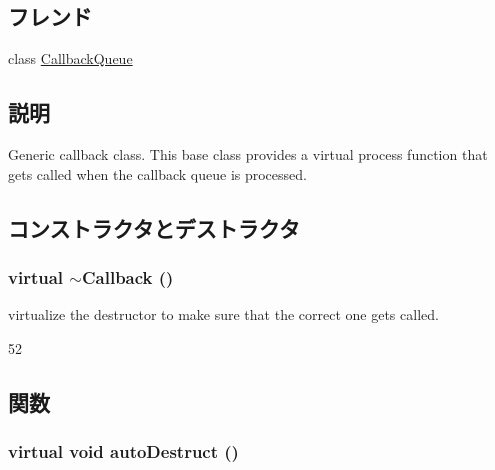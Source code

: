 \subsection*{フレンド}
\begin{DoxyCompactItemize}
\item 
class \hyperlink{classCallback_a49078cbddf43eb933f0b6de2fd77c97d}{CallbackQueue}
\end{DoxyCompactItemize}


\subsection{説明}
Generic callback class. This base class provides a virtual process function that gets called when the callback queue is processed. 

\subsection{コンストラクタとデストラクタ}
\hypertarget{classCallback_afdd27f2a21e4fdc3687ee72aae117e7d}{
\subsubsection[{$\sim$Callback}]{\setlength{\rightskip}{0pt plus 5cm}virtual $\sim${\bf Callback} ()}}
\label{classCallback_afdd27f2a21e4fdc3687ee72aae117e7d}
virtualize the destructor to make sure that the correct one gets called. 


\begin{DoxyCode}
52 {}
\end{DoxyCode}


\subsection{関数}
\hypertarget{classCallback_a6885801d71ec8b4040427994c5fd8dcf}{
\subsubsection[{autoDestruct}]{\setlength{\rightskip}{0pt plus 5cm}virtual void autoDestruct ()}}
\label{classCallback_a6885801d71ec8b4040427994c5fd8dcf}


